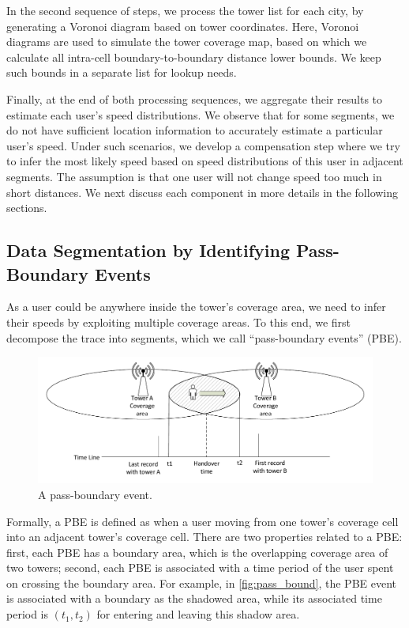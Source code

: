 In the second sequence of steps, we process the tower list for each city, by generating a Voronoi diagram based on tower coordinates. Here, Voronoi diagrams are used to simulate the tower coverage map, based on which we calculate all intra-cell boundary-to-boundary distance lower bounds. We keep such bounds in a separate list for lookup needs.

Finally, at the end of both processing sequences, we aggregate their results to estimate each user's speed distributions. We observe that for some segments, we do not have sufficient location information to accurately estimate a particular user's speed. Under such scenarios, we develop a compensation step where we try to infer the most likely speed based on speed distributions of this user in adjacent segments. The assumption is that one user will not change speed too much in short distances. We next discuss each component in more details in the following sections.

\subsection{Data Segmentation by Identifying Pass-Boundary Events}

As a user could be anywhere inside the tower's coverage area, we need to infer their speeds by exploiting multiple coverage areas. To this end, we first decompose the trace into segments, which we call ``pass-boundary events'' (PBE).

\begin{figure}[h]
    \centering
    \includegraphics[width=0.8\linewidth]{./figures/passing_boundary.pdf}
    \vspace{-0.3in}
    \caption{A pass-boundary event.}
    \label{fig:pass_bound}
\end{figure}


Formally, a PBE is defined as when a user moving from one tower's coverage cell into an adjacent tower's coverage cell. There are two properties related to a PBE: first, each PBE has a boundary area, which is the overlapping coverage area of two towers; second, each PBE is associated with a time period of the user spent on crossing the boundary area. For example, in \autoref{fig:pass_bound}, the PBE event is associated with a boundary as the shadowed area, while its associated time period is $(t_1, t_2)$ for entering and leaving this shadow area.

